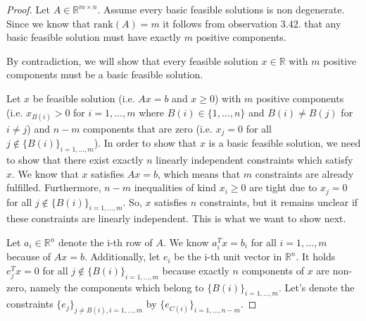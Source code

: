 \documentclass[12pt,letterpaper]{article}
\begin{document}
\begin{proof}
    Let $A \in \mathbb R^{m \times n}$. Assume every basic feasible solutions is non degenerate. Since we know that $\mathrm{rank}(A) = m$ it follows from observation 3.42. that any basic feasible solution must have exactly $m$ positive components.

    By contradiction, we will show that every feasible solution $x \in \mathbb R$ with $m$ positive components must be a basic feasible solution.

    Let $x$ be feasible solution (i.e. $Ax = b$ and $x \geq 0$) with $m$ positive components (i.e. $x_{B(i)} > 0$ for $i = 1,...,m$ where $B(i) \in \{1,...,n\}$ and $B(i) \neq B(j)$ for $i \neq j$) and $n-m$ components that are zero (i.e. $x_j = 0$ for all $j \notin \{ B(i) \}_{i=1,...,m}$). In order to show that $x$ is a basic feasible solution, we need to show that there exist exactly $n$ linearly independent constraints which satisfy $x$. We know that $x$ satisfies $Ax = b$, which means that $m$ constraints are already fulfilled. Furthermore, $n-m$ inequalities of kind $x_i \geq 0$ are tight due to $x_j = 0$ for all $j \notin \{ B(i) \}_{i=1,...,m}$. So, $x$ satisfies $n$ constraints, but it remains unclear if these constraints are linearly independent. This is what we want to show next.

    Let $a_i \in \mathbb R^{n}$ denote the i-th row of $A$. We know $a_i^T x = b_i$ for all $i = 1,...,m$ because of $Ax = b$. Additionally, let $e_i$ be the i-th unit vector in $\mathbb R^n$. It holds $e_{j}^T x = 0$ for all $j \notin \{ B(i) \}_{i=1,...,m}$ because exactly $n$ components of $x$ are non-zero, namely the components which belong to $\{ B(i) \}_{i=1,...,m}$. Let's denote the constraints $\{e_j\}_{j \neq B(i), i = 1,...,m}$ by $\{e_{C(i)}\}_{i = 1,...,n-m}$. 
    

\end{proof}
\end{document}
